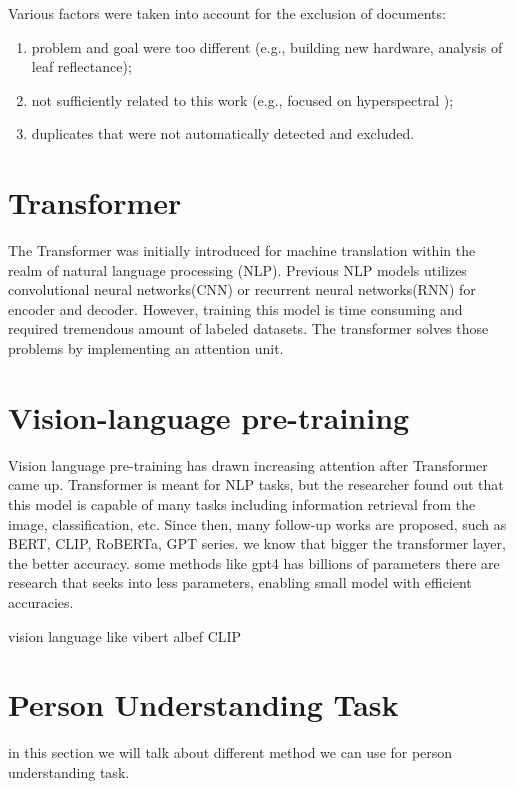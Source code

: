 Various factors were taken into account for the exclusion of documents:
\begin{enumerate}
    \item problem and goal were too different (e.g., building new hardware, analysis of leaf reflectance);
    \item not sufficiently related to this work (e.g., focused on hyperspectral );
    \item duplicates that were not automatically detected and excluded.
\end{enumerate}




\section{Transformer}
The Transformer was initially introduced for machine translation within the realm of natural language processing (NLP)\cite{vaswani2023attention}. Previous NLP models utilizes convolutional neural networks(CNN) or recurrent neural networks(RNN) for encoder and decoder. However, training this model is time consuming and required tremendous amount of labeled datasets. The transformer solves those problems by implementing an attention unit. 

\section{Vision-language pre-training}
Vision language pre-training has drawn increasing attention after Transformer came up. Transformer is meant for NLP tasks, but the researcher found out that this model is capable of many tasks including information retrieval from the image, classification, etc. Since then, many follow-up works are proposed, such as BERT, CLIP, RoBERTa, GPT series. 
we know that bigger the transformer layer, the better accuracy. some methods like gpt4 has billions of parameters 
there are research that seeks into less parameters, enabling small model with efficient accuracies.

vision language like 
vibert
albef 
CLIP


\section{Person Understanding Task}
in this section we will talk about different method we can use for person understanding task. 
